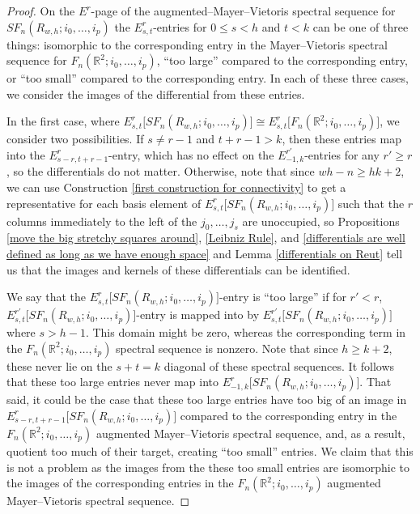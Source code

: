 \documentclass[pagebackref,colorlinks,citecolor=blue,linkcolor=blue,urlcolor=blue,filecolor=blue]{article}
\theoremstyle{definition}\newtheorem{definition}[thm]{Definition}
\theoremstyle{definition}
\newcommand{\R}{\ensuremath{\mathbb{R}}}
\begin{document}
\begin{proof}
On the $E^{r}$-page of the augmented--Mayer--Vietoris spectral sequence for $SF_{n}(R_{w,h}; i_{0}, \dots, i_{p})$ the $E^{r}_{s,t}$-entries for $0\le s<h$ and $t<k$ can be one of three things: isomorphic to the corresponding entry in the Mayer--Vietoris spectral sequence for $F_{n}(\R^{2}; i_{0}, \dots, i_{p})$, ``too large'' compared to the corresponding entry, or ``too small'' compared to the corresponding entry.
In each of these three cases, we consider the images of the differential from these entries.

In the first case, where $E^{r}_{s,t}\big[SF_{n}(R_{w,h}; i_{0}, \dots, i_{p})\big]\cong E^{r}_{s,t}\big[F_{n}(\R^{2}; i_{0}, \dots, i_{p})\big]$, we consider two possibilities.
If $s\neq r-1$ and $t+r-1>k$, then these entries map into the $E^{r}_{s-r, t+r-1}$-entry, which has no effect on the $E^{r'}_{-1, k}$-entries for any $r'\ge r$, so the differentials do not matter.
Otherwise, note that since $wh-n\ge hk+2$, we can use Construction \ref{first construction for connectivity} to get a representative for each basis element of $E^{r}_{s,t}\big[SF_{n}(R_{w,h}; i_{0}, \dots, i_{p})\big]$ such that the $r$ columns immediately to the left of the $j_{0}, \dots, j_{s}$ are unoccupied, so Propositions \ref{move the big stretchy squares around}, \ref{Leibniz Rule}, and \ref{differentials are well defined as long as we have enough space} and Lemma \ref{differentials on Reut} tell us that the images and kernels of these differentials can be identified.

We say that the $E^{r}_{s,t}\big[SF_{n}(R_{w,h}; i_{0}, \dots, i_{p})\big]$-entry is ``too large'' if for $r'<r$, $E^{r'}_{s,t}\big[SF_{n}(R_{w,h}; i_{0}, \dots, i_{p})\big]$-entry is mapped into by $E^{r'}_{s,t}\big[SF_{n}(R_{w,h}; i_{0}, \dots, i_{p})\big]$ where $s>h-1$.
This domain might be zero, whereas the corresponding term in the $F_{n}(\R^{2}; i_{0}, \dots, i_{p})$ spectral sequence is nonzero.
Note that since $h\ge k+2$, these never lie on the $s+t=k$ diagonal of these spectral sequences.
It follows that these too large entries never map into $E^{r}_{-1, k}\big[SF_{n}(R_{w,h}; i_{0}, \dots, i_{p})\big]$.
That said, it could be the case that these too large entries have too big of an image in $E^{r}_{s-r, t+r-1}\big[SF_{n}(R_{w,h}; i_{0}, \dots, i_{p})\big]$ compared to the corresponding entry in the $F_{n}(\R^{2}; i_{0}, \dots, i_{p})$ augmented Mayer--Vietoris spectral sequence, and, as a result, quotient too much of their target, creating ``too small'' entries.
We claim that this is not a problem as the images from the these too small entries are isomorphic to the images of the corresponding entries in the $F_{n}(\R^{2}; i_{0}, \dots, i_{p})$ augmented Mayer--Vietoris spectral sequence.


\end{proof}
\end{document}
